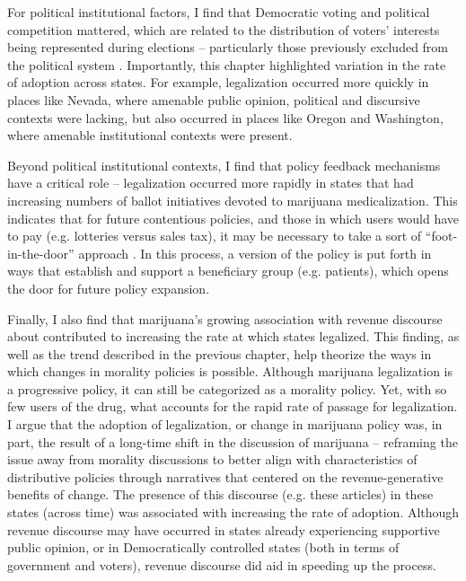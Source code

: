 For political institutional factors, I find that Democratic voting and political competition mattered, which are related to the distribution of voters' interests being represented during elections -- particularly those previously excluded from the political system \citep{soule_and_olzak_2004}. Importantly, this chapter highlighted variation in the rate of adoption across states. For example, legalization occurred more quickly in places like Nevada, where amenable public opinion, political and discursive contexts were lacking, but also occurred in places like Oregon and Washington, where amenable institutional contexts were present. %

Beyond political institutional contexts, I find that policy feedback mechanisms have a critical role -- legalization occurred more rapidly in states that had increasing numbers of ballot initiatives devoted to marijuana medicalization. This indicates that for future contentious policies, and those in which users would have to pay (e.g. lotteries versus sales tax), it may be necessary to take a sort of ``foot-in-the-door'' approach \citep{cialdini_1984,freedman_and_fraser_1966}. In this process, a version of the policy is put forth in ways that establish and support a beneficiary group (e.g. patients), which opens the door for future policy expansion. 

Finally, I also find that marijuana's growing association with revenue discourse about contributed to increasing the rate at which states legalized. This finding, as well as the trend described in the previous chapter, help theorize the ways in which changes in morality policies is possible. Although marijuana legalization is a progressive policy, it can still be categorized as a morality policy. Yet, with so few users of the drug, what accounts for the rapid rate of passage for legalization. I argue that the adoption of legalization, or change in marijuana policy was, in part, the result of a long-time shift in the discussion of marijuana -- reframing the issue away from morality discussions to better align with characteristics of distributive policies through narratives that centered on the revenue-generative benefits of change. The presence of this discourse (e.g. these articles) in these states (across time) was associated with increasing the rate of adoption. Although revenue discourse may have occurred in states already experiencing supportive public opinion, or in Democratically controlled states (both in terms of government and voters), revenue discourse did aid in speeding up the process. 

